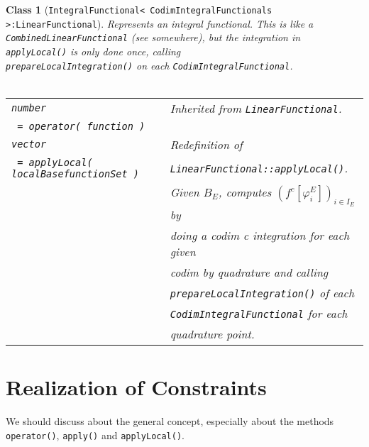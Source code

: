 \documentclass[a4paper,11pt]{article}
\numberwithin{equation}{section}
\newtheorem{class}[definition]{Class}
\newcommand{\theoremEndLine}{\hspace{1mm}}
\newcommand{\CodeT}[1]{\textnormal{\texttt{#1}}}
\begin{document}
    \begin{class}[\CodeT{IntegralFunctional< CodimIntegralFunctionals >:LinearFunctional}]
    Represents an integral functional. This is like a \CodeT{CombinedLinearFunctional} (see somewhere), but the
    integration in \CodeT{applyLocal()} is only done once, calling\\
    \CodeT{prepareLocalIntegration()} on each \CodeT{CodimIntegralFunctional}.\\\\
      \begin{tabular}{|l|l|}
        \hline
        \CodeT{number}
          & Inherited from \CodeT{LinearFunctional}.\\
        \CodeT{ = operator( function )}
          & \\
        \hline
        \CodeT{vector}
          & Redefinition of\\
        \CodeT{ = applyLocal( localBasefunctionSet )}
          & \CodeT{LinearFunctional::applyLocal()}.\\
          & Given ${B_E}$, computes ${(f^c[\varphi_i^E])_{i\in I_E}}$ by\\
          & doing a codim c integration for each given\\
          & codim by quadrature and calling\\
          & \CodeT{prepareLocalIntegration()} of each\\
          & \CodeT{CodimIntegralFunctional} for each\\
          & quadrature point.\\
        \hline
      \end{tabular}
    \end{class}\theoremEndLine


\section{Realization of Constraints}

	We should discuss about the general concept, especially about the methods \CodeT{operator()}, \CodeT{apply()} and \CodeT{applyLocal()}.\\
\end{document}
